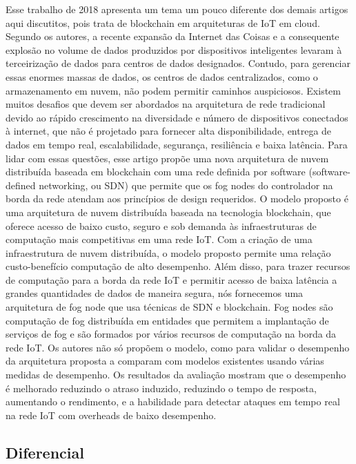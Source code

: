     Esse trabalho de 2018 \cite{sharma2018software} apresenta um tema um pouco diferente dos demais artigos aqui discutitos, pois trata de blockchain em arquiteturas de IoT em cloud. Segundo os autores, a recente expansão da Internet das Coisas e a consequente explosão no volume de dados produzidos por dispositivos inteligentes levaram à terceirização de dados para centros de dados designados. Contudo, para gerenciar essas enormes massas de dados, os centros de dados centralizados, como o armazenamento em nuvem, não podem permitir caminhos auspiciosos. Existem muitos desafios que devem ser abordados na arquitetura de rede tradicional devido ao rápido crescimento na diversidade e número de dispositivos conectados à internet, que não é projetado para fornecer alta disponibilidade, entrega de dados em tempo real, escalabilidade, segurança, resiliência e baixa latência. Para lidar com essas questões, esse artigo propõe uma nova arquitetura de nuvem distribuída baseada em blockchain com uma rede definida por software (software-defined networking, ou SDN) que permite que os fog nodes do controlador na borda da rede atendam aos princípios de design requeridos. O modelo proposto é uma arquitetura de nuvem distribuída baseada na tecnologia blockchain, que oferece acesso de baixo custo, seguro e sob demanda às infraestruturas de computação mais competitivas em uma rede IoT. Com a criação de uma infraestrutura de nuvem distribuída, o modelo proposto permite uma relação custo-benefício computação de alto desempenho. Além disso, para trazer recursos de computação para a borda da rede IoT e permitir acesso de baixa latência a grandes quantidades de dados de maneira segura, nós fornecemos uma arquitetura de fog node que usa técnicas de SDN e blockchain. Fog nodes são computação de fog distribuída em entidades que permitem a implantação de serviços de fog e são formados por vários recursos de computação na borda da rede IoT. Os autores não só propõem o modelo, como para validar o desempenho da arquitetura proposta a comparam com modelos existentes usando várias medidas de desempenho. Os resultados da avaliação mostram que o desempenho é melhorado reduzindo o atraso induzido, reduzindo o tempo de resposta, aumentando o rendimento, e a habilidade para detectar ataques em tempo real na rede IoT com overheads de baixo desempenho.

\subsection{Diferencial}

